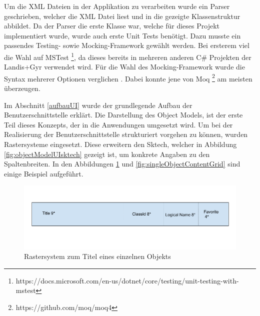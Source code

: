 Um die XML Dateien in der Applikation zu verarbeiten wurde ein Parser geschrieben, welcher die XML Datei liest und in die gezeigte Klassenstruktur abbildet.
Da der Parser die erste Klasse war, welche für dieses Projekt implementiert wurde, wurde auch erste Unit Tests benötigt.
Dazu musste ein passendes Testing- sowie Mocking-Framework gewählt werden.
Bei ersterem viel die Wahl auf MSTest \footnote{https://docs.microsoft.com/en-us/dotnet/core/testing/unit-testing-with-mstest}, da dieses bereits in mehreren anderen C\# Projekten der Landis+Gyr verwendet wird.
Für die Wahl des Mocking-Framework wurde die Syntax mehrerer Optionen verglichen \parencite{clarke_2020}.
Dabei konnte jene von Moq \footnote{https://github.com/moq/moq4} am meisten überzeugen.

Im Abschnitt \ref{aufbauUI} wurde der grundlegende Aufbau der Benutzerschnittstelle erklärt.
Die Darstellung des Object Models, ist der erste Teil dieses Konzepts, der in die Anwendungen umgesetzt wird.
Um bei der Realisierung der Benutzerschnittstelle strukturiert vorgehen zu können, wurden Rastersysteme eingesetzt.
Diese erweitern den Sktech, welcher in Abbildung \ref{fig:objectModelUIsktech} gezeigt ist, um konkrete Angaben zu den Spaltenbreiten.
In den Abbildungen \ref{fig:singleObjectTitleGrid} und \ref{fig:singleObjectContentGrid} sind einige Beispiel aufgeführt.

\begin{figure}
   \centering
   \includegraphics[width=1.0\textwidth]{gfx/Single Object Title Line Grid.png}
   \caption{
      Rastersystem zum Titel eines einzelnen Objekts
      }
      \label{fig:singleObjectTitleGrid}
\end{figure}


